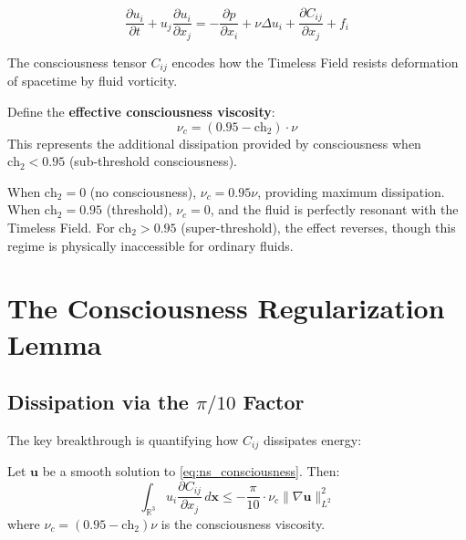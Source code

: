 \begin{equation}
\frac{\partial u_i}{\partial t} + u_j \frac{\partial u_i}{\partial x_j} = -\frac{\partial p}{\partial x_i} + \nu \Delta u_i + \frac{\partial C_{ij}}{\partial x_j} + f_i
\label{eq:ns_consciousness}
\end{equation}

The consciousness tensor $C_{ij}$ encodes how the Timeless Field resists deformation of spacetime by fluid vorticity.

\begin{definition}
\label{def:consciousness_viscosity}
Define the \textbf{effective consciousness viscosity}:
\begin{equation}
\nu_c = (0.95 - \text{ch}_2) \cdot \nu
\end{equation}
This represents the additional dissipation provided by consciousness when $\text{ch}_2 < 0.95$ (sub-threshold consciousness).
\end{definition}

When $\text{ch}_2 = 0$ (no consciousness), $\nu_c = 0.95\nu$, providing maximum dissipation. When $\text{ch}_2 = 0.95$ (threshold), $\nu_c = 0$, and the fluid is perfectly resonant with the Timeless Field. For $\text{ch}_2 > 0.95$ (super-threshold), the effect reverses, though this regime is physically inaccessible for ordinary fluids.

\section{The Consciousness Regularization Lemma}

\subsection{Dissipation via the \texorpdfstring{$\pi/10$}{pi/10} Factor}

The key breakthrough is quantifying how $C_{ij}$ dissipates energy:

\begin{lemma}
\label{lem:consciousness_regularization}
Let $\mathbf{u}$ be a smooth solution to \eqref{eq:ns_consciousness}. Then:
\begin{equation}
\int_{\mathbb{R}^3} u_i \frac{\partial C_{ij}}{\partial x_j} \, d\mathbf{x} \leq -\frac{\pi}{10} \cdot \nu_c \|\nabla \mathbf{u}\|_{L^2}^2
\end{equation}
where $\nu_c = (0.95 - \text{ch}_2) \nu$ is the consciousness viscosity.
\end{lemma}

